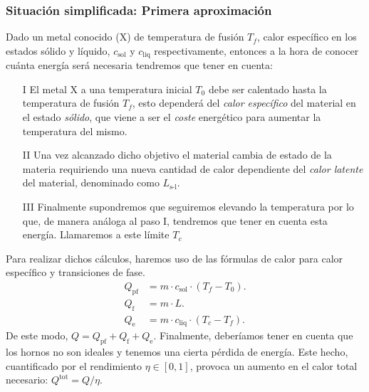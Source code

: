 \subsubsection{Situación simplificada: Primera aproximación} \label{PrimeraAproximacion}
%
%
%
Dado un metal conocido (X) de temperatura de fusión $T_f$, calor específico en los estados sólido y líquido, $c_{\text{sol}}$ y $c_{\text{liq}}$ respectivamente, entonces a la hora de conocer cuánta energía será necesaria tendremos que tener en cuenta:
\begin{itemize}
    \item[I] El metal X a una temperatura inicial $T_0$ debe ser calentado hasta la temperatura de fusión $T_f$, esto dependerá del \textit{calor específico} del material en el estado \textit{sólido}, que viene a ser el \textit{coste} energético para aumentar la temperatura del mismo.
    \item[II] Una vez alcanzado dicho objetivo el material cambia de estado de la materia requiriendo una nueva cantidad de calor dependiente del \textit{calor latente} del material, denominado como $L_{\text{s-l}}$.
    \item[III] Finalmente supondremos que seguiremos elevando la temperatura por lo que, de manera análoga al paso I, tendremos que tener en cuenta esta energía. Llamaremos a este límite $T_c$
\end{itemize}
Para realizar dichos cálculos, haremos uso de las fórmulas de calor para calor específico y transiciones de fase.
\begin{align}
    Q_{\text{pf}} &= m \cdot c_{\text{sol}} \cdot (T_f-T_0).\\
    Q_{\text{f}} &= m \cdot L.\\
    Q_{\text{e}} &= m \cdot c_{\text{liq}} \cdot (T_c-T_f).
\end{align}
De este modo, $Q = Q_{\text{pf}} + Q_{\text{f}} + Q_{\text{e}}$. Finalmente, deberíamos tener en cuenta que los hornos no son ideales y tenemos una cierta pérdida de energía. Este hecho, cuantificado por el rendimiento $\eta \in [0,1]$, provoca un aumento en el calor total necesario: $Q^{\text{tot}} = Q/\eta$.


